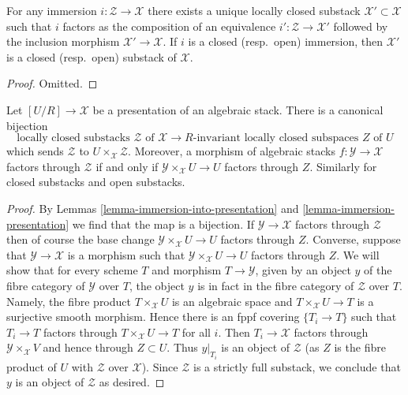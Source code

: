 \begin{lemma}
\label{lemma-substack-image}
For any immersion $i : \mathcal{Z} \to \mathcal{X}$ there exists a
unique locally closed substack $\mathcal{X}' \subset \mathcal{X}$
such that $i$ factors as the composition of
an equivalence $i' : \mathcal{Z} \to \mathcal{X}'$
followed by the inclusion morphism $\mathcal{X}' \to \mathcal{X}$.
If $i$ is a closed (resp.\ open) immersion, then $\mathcal{X}'$
is a closed (resp.\ open) substack of $\mathcal{X}$.
\end{lemma}

\begin{proof}
Omitted.
\end{proof}

\begin{lemma}
\label{lemma-substacks-presentation}
Let $[U/R] \to \mathcal{X}$ be a presentation of an algebraic stack.
There is a canonical bijection
$$
\text{locally closed substacks }\mathcal{Z}\text{ of }\mathcal{X}
\longrightarrow
R\text{-invariant locally closed subspaces }Z\text{ of }U
$$
which sends $\mathcal{Z}$ to $U \times_\mathcal{X} \mathcal{Z}$.
Moreover, a morphism of algebraic stacks $f : \mathcal{Y} \to \mathcal{X}$
factors through $\mathcal{Z}$ if and only if
$\mathcal{Y} \times_\mathcal{X} U \to U$ factors through $Z$.
Similarly for closed substacks and open substacks.
\end{lemma}

\begin{proof}
By Lemmas \ref{lemma-immersion-into-presentation} and
\ref{lemma-immersion-presentation}
we find that the map is a bijection.
If $\mathcal{Y} \to \mathcal{X}$ factors through $\mathcal{Z}$
then of course the base change $\mathcal{Y} \times_\mathcal{X} U \to U$
factors through $Z$. Converse, suppose that $\mathcal{Y} \to \mathcal{X}$
is a morphism such that $\mathcal{Y} \times_\mathcal{X} U \to U$
factors through $Z$. We will show that for every scheme $T$ and
morphism $T \to \mathcal{Y}$,
given by an object $y$ of the fibre category of $\mathcal{Y}$ over $T$,
the object $y$ is in fact in the fibre category of $\mathcal{Z}$ over $T$.
Namely, the fibre product $T \times_\mathcal{X} U$ is an algebraic
space and $T \times_\mathcal{X} U \to T$ is a surjective smooth morphism.
Hence there is an fppf covering $\{T_i \to T\}$ such that
$T_i \to T$ factors through $T \times_\mathcal{X} U \to T$ for all $i$.
Then $T_i \to \mathcal{X}$ factors through $\mathcal{Y} \times_\mathcal{X} V$
and hence through $Z \subset U$. Thus $y|_{T_i}$ is an object of
$\mathcal{Z}$ (as $Z$ is the fibre product of $U$ with
$\mathcal{Z}$ over $\mathcal{X}$).
Since $\mathcal{Z}$ is a strictly full substack, we conclude
that $y$ is an object of $\mathcal{Z}$ as desired.
\end{proof}

